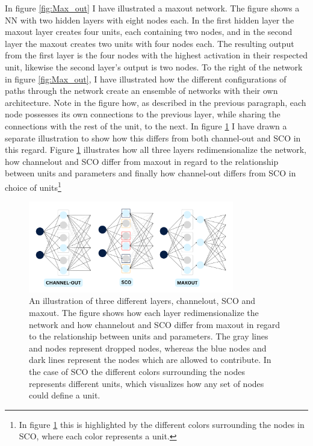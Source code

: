 In figure \ref{fig:Max_out} I have illustrated a maxout network. The figure shows a \ac{NN} with two hidden layers
with eight nodes each. In the first hidden layer the maxout layer creates four units, each containing two nodes, and in the 
second layer the maxout creates two units with four nodes each. The resulting output from the first layer is the 
four nodes with the highest activation in their respected unit, likewise the second layer's output is two nodes.
To the right of the network in figure \ref{fig:Max_out}, I have illustrated how the different configurations of 
paths through the network create an ensemble of networks with their own architecture. Note in the figure how, as described in the 
previous paragraph, each node possesses its own connections to the previous layer, while sharing the connections with the 
rest of the unit, to the next. In figure \ref{fig:NetEnsembleComp} I have drawn a separate illustration to show how 
this differs from both channel-out and \ac{SCO} in this regard. Figure \ref{fig:NetEnsembleComp} illustrates how 
all three layers redimensionalize the network, how channelout and \ac{SCO} differ from maxout in regard to the relationship 
between units and parameters and finally how channel-out differs from \ac{SCO} in choice of units\footnote{In figure 
\ref{fig:NetEnsembleComp} this is highlighted by the different colors surrounding the nodes in \ac{SCO}, where each color 
represents a unit.}
\begin{figure}
    \centering
    \includegraphics[width=0.8\textwidth]{Figures/Illustrations/EnsembleComp.png}
    \caption[An illustration of three different layers, channelout, \acs{SCO} and maxout.]{An illustration of three different layers, channelout, 
    \ac{SCO} and maxout. The figure shows how each layer redimensionalize the network and how channelout and \ac{SCO} differ from maxout in regard 
    to the relationship between units and parameters. The gray lines and nodes represent dropped nodes, whereas the blue nodes and dark lines represent
    the nodes which are allowed to contribute. In the case of \ac{SCO} the different colors surrounding the nodes represents different units, which 
    visualizes how any set of nodes could define a unit.}
    \label{fig:NetEnsembleComp}
\end{figure}
